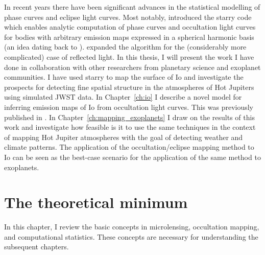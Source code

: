 \documentclass[12pt,dvipsnames]{report}
\newcommand{\ssf}[1]{\textsf{#1}}
\begin{document}
In recent years there have been significant advances in the statistical modelling of
phase curves and eclipse light curves. Most notably,
\citet{2019AJ....157...64L} introduced the \ssf{starry} code which enables
analytic computation of phase curves and occultation light curves for bodies
with arbitrary emission maps expressed in a spherical harmonic basis (an idea
dating back to \citet{1906ApJ....24....1R} ). \citet{2021arXiv210306275L}
expanded the algorithm for the (considerably more complicated) case of
reflected light. In this thesis, I will present the work I have done in
collaboration with other researchers from planetary science and exoplanet
communities. I have used \ssf{starry} to map the surface of Io and investigate the
prospects for detecting fine spatial structure in the atmospheres of Hot
Jupiters using simulated JWST data. In Chapter~\ref{ch:io} I describe a  novel model for 
inferring emission maps of Io from occultation light curves. This was previously published 
in \citet{2022PSJ.....3...67B}. 
In Chapter~\ref{ch:mapping_exoplanets} I draw on the results of this work and 
investigate how feasible is it to use the same techniques in the context of 
mapping Hot Jupiter atmospheres with the goal of detecting weather and climate patterns.
The application of the occultation/eclipse mapping method to Io can be seen as the
best-case scenario for the application of the same method to exoplanets.

\chapter{The theoretical minimum}
\label{ch:theoretical_min}

In this chapter, I review the basic concepts in microlensing, occultation mapping,
and computational statistics. These concepts are necessary for understanding the subsequent 
chapters.
\end{document}
